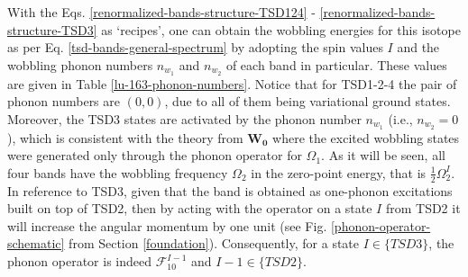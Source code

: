 With the Eqs. \ref{renormalized-bands-structure-TSD124} - \ref{renormalized-bands-structure-TSD3} as `recipes', one can obtain the wobbling energies for this isotope as per Eq. \ref{tsd-bands-general-spectrum} by adopting the spin values $I$ and the wobbling phonon numbers $n_{w_1}$ and $n_{w_2}$ of each band in particular. These values are given in Table \ref{lu-163-phonon-numbers}. Notice that for TSD1-2-4 the pair of phonon numbers are $(0,0)$, due to all of them being variational ground states. Moreover, the TSD3 states are activated by the phonon number $n_{w_1}$ (i.e., $n_{w_2}=0$), which is consistent with the theory from $\mathbf{W_0}$ where the excited wobbling states were generated only through the phonon operator for $\Omega_1$. As it will be seen, all four bands have the wobbling frequency $\Omega_2$ in the zero-point energy, that is $\frac{1}{2}\Omega_2^I$. In reference to TSD3, given that the band is obtained as one-phonon excitations built on top of TSD2, then by acting with the operator on a state $I$ from TSD2 it will increase the angular momentum by one unit (see Fig. \ref{phonon-operator-schematic} from Section \ref{foundation}). Consequently, for a state $I\in\{TSD3\}$, the phonon operator is indeed $\mathcal{F}_{10}^{I-1}$ and $I-1\in\{TSD2\}$.
\begin{table}
    \centering
    \caption{The wobbling phonon numbers of $^{163}$Lu that correspond to the phonon frequencies $\Omega_1$ and $\Omega_2$, respectively (see Eq. \ref{phononic-term-tsd-energies}). For completeness the first ($I_0$) and last ($I_t$ for \emph{terminus}) spin states of each band are given. The quasi-particles involved in the particle + rotor coupling are denoted according to Eqs. \ref{renormalized-bands-structure-TSD124} - \ref{renormalized-bands-structure-TSD3}. See text for the $\mathcal{F}_{10}^{I-1}$ term.}
    \label{lu-163-phonon-numbers}
\end{table}

